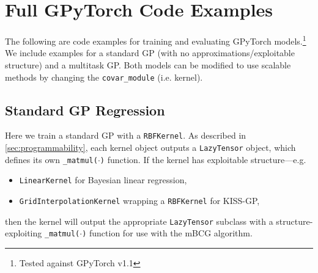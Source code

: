 \chapter{Full GPyTorch Code Examples}

The following are code examples for training and evaluating GPyTorch models.\footnote{
  Tested against GPyTorch v1.1
}
We include examples for a standard GP (with no approximations/exploitable structure) and a multitask GP.
Both models can be modified to use scalable methods by changing the {\tt covar\_module} (i.e. kernel).



\section{Standard GP Regression}
\label{app:standard_gp_example}

Here we train a standard GP with a {\tt RBFKernel}.
As described in \cref{sec:programmability}, each kernel object outputs a {\tt LazyTensor} object, which defines its own {\tt \_matmul($\cdot$)} function.
If the kernel has exploitable structure---e.g.
%
\begin{itemize}
  \item {\tt LinearKernel} for Bayesian linear regression,
  \item {\tt GridInterpolationKernel} wrapping a {\tt RBFKernel} for KISS-GP,
\end{itemize}
%
then the kernel will output the appropriate {\tt LazyTensor} subclass with a structure-exploiting {\tt \_matmul($\cdot$)} function for use with the mBCG algorithm.

